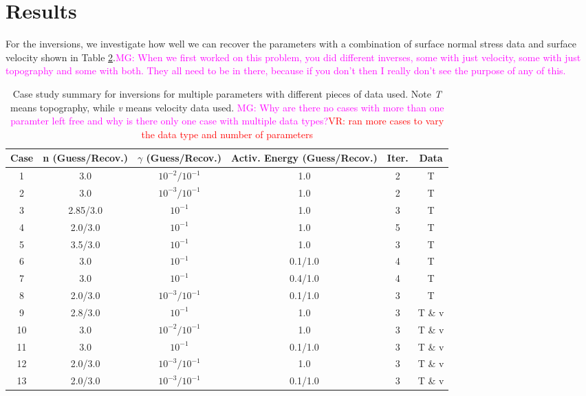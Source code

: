 \documentclass[12pt]{article}
\newcommand{\mgnote}[1]{\textcolor{magenta}{MG: #1}}
\newcommand{\vrnote}[1]{\textcolor{red}{VR: #1}}
\begin{document}
\section*{Results}
For the inversions, we investigate how well we can recover the parameters with a combination of surface normal stress data and surface velocity  shown in Table \ref{table:inversions}.\mgnote{When we first worked on this problem, you did different inverses, some with just velocity, some with just topography and some with both. They all need to be in there, because if you don't then I really don't see the purpose of any of this.}
\begin{table}
\centering
	\begin{table}[H]
		\caption{Case study summary for inversions for multiple parameters with different pieces of data used. Note \textit{T} means topography, while \textit{v} means velocity data used. \mgnote{Why are there no cases with more than one paramter left free and why is there only one case with multiple data types?}\vrnote{ran more cases to vary the data type and number of parameters}} %
		\centering  %
		\begin{tabular}{c c c c c c} %
		\hline \hline                        %
		Case&n (Guess/Recov.) &$\gamma$ (Guess/Recov.)   &Activ. Energy (Guess/Recov.) &Iter. & Data  \\ [0.5ex] %
		\hline                  %
	        1 & 3.0  & $10^{-2}/10^{-1}$ &   1.0 & 2  & T\\
	        2 & 3.0  & $10^{-3}/10^{-1}$ & 1.0 & 2 & T\\
	        3 & 2.85/3.0  & $10^{-1}$ & 1.0  & 3 & T \\
	        4 & 2.0/3.0  & $10^{-1}$  & 1.0  & 5 & T \\
	        5 & 3.5/3.0  & $10^{-1}$   & 1.0  &3 & T \\
	        6 & 3.0  & $10^{-1}$  & 0.1/1.0  & 4 & T \\
	        7 & 3.0  & $10^{-1}$  & 0.4/1.0  & 4 & T \\
            8 & 2.0/3.0  & $10^{-3}/10^{-1}$ & 0.1/1.0  & 3 & T \\
	        9 & 2.8/3.0  & $10^{-1}$  & 1.0  & 3 & T \& v\\
	        10 & 3.0  & $10^{-2}/10^{-1}$ & 1.0  & 3 & T \& v\\
            11 & 3.0  & $10^{-1}$ & 0.1/1.0  & 3 & T \& v\\
            12 & 2.0/3.0  & $10^{-3}/10^{-1}$ & 1.0  & 3 & T \& v\\
            13 & 2.0/3.0  & $10^{-3}/10^{-1}$ & 0.1/1.0  & 3 & T \& v\\

                 
                \hline %
		\end{tabular}
		\label{table:inversions} %
		\end{table}

\end{table}
\end{document}
